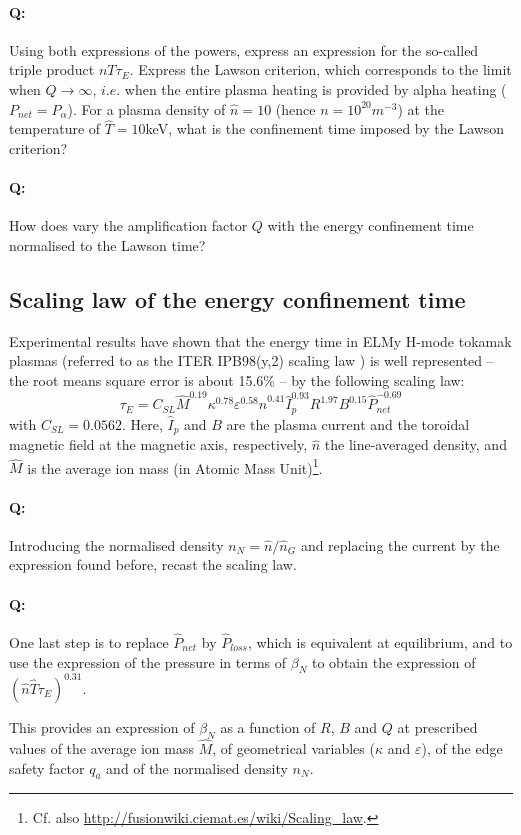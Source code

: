 \paragraph{Q:} Using both expressions of the powers, express an expression for the so-called triple product $nT\tau_E$. Express the Lawson criterion, which corresponds to the limit when $Q\to\infty$, $i.e.$ when the entire plasma heating is provided by alpha heating ($P_{net}=P_\alpha$). For a plasma density of $\hat n=10$ (hence $n=10^{20}\si{m^{-3}}$) at the temperature of $\hat T=10$keV, what is the confinement time imposed by the Lawson criterion?


\paragraph{Q:} How does vary the amplification factor $Q$ with the energy confinement time normalised to the Lawson time?



\subsection{Scaling law of the energy confinement time}

Experimental results have shown that the energy time in ELMy H-mode tokamak plasmas (referred to as the ITER IPB98(y,2) scaling law \cite[eq.(20)]{ITERphysics_chap2}) is well represented -- the root means square error is about 15.6\% -- by the following scaling law:
\begin{equation*}
  \tau_E = C_{SL} \hat M^{0.19} \kappa^{0.78} \varepsilon^{0.58} 
  \hat n^{0.41} \hat I_p^{0.93} R^{1.97} B^{0.15}  \hat P_{net}^{-0.69}
\end{equation*}
with $C_{SL} = 0.0562$.
Here, $\hat I_p$ and $B$ are the plasma current and the toroidal magnetic field at the magnetic axis, respectively, $\hat n$ the line-averaged density, and $\hat M$ is the average ion mass (in Atomic Mass Unit)\footnote{Cf. also \url{http://fusionwiki.ciemat.es/wiki/Scaling_law}.}. 

\paragraph{Q:} 
Introducing the normalised density $n_N = \hat n/\hat n_G$ and replacing the current by the expression found before, recast the scaling law. 
\paragraph{Q:} One last step is to replace $\hat P_{net}$ by $\hat P_{loss}$, which is equivalent at equilibrium, and to use the expression of the pressure in terms of $\beta_N$ to obtain the expression of $(\hat n\hat T\tau_E)^{0.31}$. 

This provides an expression of $\beta_N$ as a function of $R$, $B$ and $Q$ at prescribed values of the average ion mass $\hat M$, of geometrical variables ($\kappa$ and $\varepsilon$), of the edge safety factor $q_a$ and of the normalised density $n_N$.
